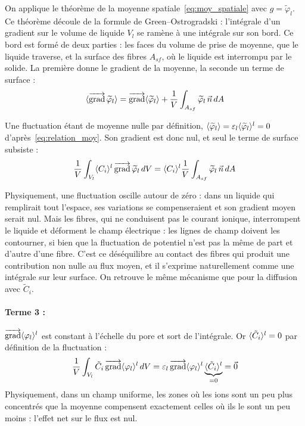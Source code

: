 On applique le théorème de la moyenne spatiale~\eqref{eq:moy_spatiale}
avec $g = \widetilde{\varphi}_l$. Ce théorème découle de la formule de
Green--Ostrogradski : l'intégrale d'un gradient sur le volume de liquide
$V_l$ se ramène à une intégrale sur son bord. Ce bord est formé de deux
parties : les faces du volume de prise de moyenne, que le liquide
traverse, et la surface des fibres $A_{sf}$, où le liquide est
interrompu par le solide. La première donne le gradient de la moyenne,
la seconde un terme de surface :
\begin{equation}
\langle \mathop{\overrightarrow{\operatorname{grad}}}\nolimits\widetilde{\varphi}_l \rangle
= \mathop{\overrightarrow{\operatorname{grad}}}\nolimits\langle \widetilde{\varphi}_l \rangle
+ \frac{1}{V}\int_{A_{sf}} \widetilde{\varphi}_l\,\vec{n}\, dA
\end{equation}

Une fluctuation étant de moyenne nulle par définition,
$\langle \widetilde{\varphi}_l \rangle = \varepsilon_l\langle \widetilde{\varphi}_l \rangle^l = 0$
d'après~\eqref{eq:relation_moy}. Son gradient est donc nul, et seul le
terme de surface subsiste :
\begin{equation}
\frac{1}{V}\int_{V_l} \langle C_i \rangle^l \mathop{\overrightarrow{\operatorname{grad}}}\nolimits\widetilde{\varphi}_l\, dV
= \langle C_i \rangle^l \frac{1}{V}\int_{A_{sf}} \widetilde{\varphi}_l\,\vec{n}\, dA
\end{equation}

Physiquement, une fluctuation oscille autour de zéro : dans un liquide
qui remplirait tout l'espace, ses variations se compenseraient et son
gradient moyen serait nul. Mais les fibres, qui ne conduisent pas le
courant ionique, interrompent le liquide et déforment le champ
électrique : les lignes de champ doivent les contourner, si bien que la
fluctuation de potentiel n'est pas la même de part et d'autre d'une
fibre. C'est ce déséquilibre au contact des fibres qui produit une
contribution non nulle au flux moyen, et il s'exprime naturellement
comme une intégrale sur leur surface. On retrouve le même mécanisme que
pour la diffusion avec $\tilde{C}_i$.

\paragraph{Terme 3 :}
$\mathop{\overrightarrow{\operatorname{grad}}}\nolimits\langle \varphi_l \rangle^l$ est constant à l'échelle du pore et sort de l'intégrale.
Or $\langle \tilde{C}_i \rangle^l = 0$ par définition de la fluctuation :
\begin{equation}
\frac{1}{V}\int_{V_l} \tilde{C}_i \mathop{\overrightarrow{\operatorname{grad}}}\nolimits\langle \varphi_l \rangle^l\, dV
= \varepsilon_l \mathop{\overrightarrow{\operatorname{grad}}}\nolimits\langle \varphi_l \rangle^l \underbrace{\langle \tilde{C}_i \rangle^l}_{=0} = \vec{0}
\end{equation}
Physiquement, dans un champ uniforme, les zones où les ions sont un peu plus
concentrés que la moyenne compensent exactement celles où ils le sont un peu
moins : l'effet net sur le flux est nul.

